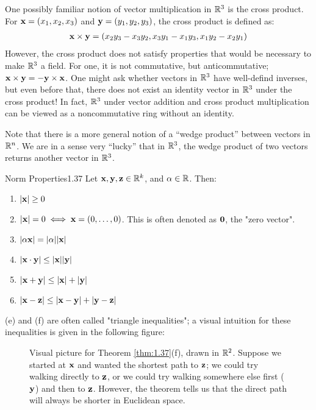 One possibly familiar notion of vector multiplication in $\mathbb{R}^3$ is the cross product. For $\mathbf{x} = (x_1, x_2, x_3)$ and $\mathbf{y} = (y_1, y_2, y_3)$, the cross product is defined as:
\begin{align*}
    \mathbf{x} \times \mathbf{y} = (x_2y_3 - x_3y_2, x_3y_1 - x_1y_3, x_1y_2 - x_2y_1)
\end{align*}
However, the cross product does not satisfy properties that would be necessary to make $\mathbb{R}^3$ a field. For one, it is not commutative, but anticommutative; $\mathbf{x} \times \mathbf{y} = -\mathbf{y} \times \mathbf{x}$. One might ask whether vectors in $\mathbb{R}^3$ have well-defind inverses, but even before that, there does not exist an identity vector in $\mathbb{R}^3$ under the cross product! In fact, $\mathbb{R}^3$ under vector addition and cross product multiplication can be viewed as a noncommutative ring without an identity. 

Note that there is a more general notion of a ``wedge product'' between vectors in $\mathbb{R}^n$. We are in a sense very ``lucky'' that in $\mathbb{R}^3$, the wedge product of two vectors returns another vector in $\mathbb{R}^3$. 

\begin{theorem}{Norm Properties}{1.37}
    Let $\mathbf{x}, \mathbf{y}, \mathbf{z} \in \mathbb{R}^k$, and $\alpha \in \mathbb{R}$. Then:
    \begin{enumerate}
        \item $\abs{\mathbf{x}} \geq 0$
        \item $\abs{\mathbf{x}} = 0 \iff \mathbf{x} = (0, \ldots, 0)$. This is often denoted as $\mathbf{0}$, the "zero vector". 
        \item $\abs{\alpha\mathbf{x}} = \abs{\alpha}\abs{\mathbf{x}}$
        \item $\abs{\mathbf{x} \cdot \mathbf{y}} \leq \abs{\mathbf{x}}\abs{\mathbf{y}}$ 
        \item $\abs{\mathbf{x} + \mathbf{y}} \leq \abs{\mathbf{x}} + \abs{\mathbf{y}}$
        \item $\abs{\mathbf{x} - \mathbf{z}} \leq \abs{\mathbf{x} - \mathbf{y}} + \abs{\mathbf{y} - \mathbf{z}}$
    \end{enumerate}
\end{theorem}
\noindent (e) and (f) are often called "triangle inequalities"; a visual intuition for these inequalities is given in the following figure:
\begin{figure}[htbp]
    \centering
    \caption{Visual picture for Theorem \ref{thm:1.37}(f), drawn in $\mathbb{R}^2$. Suppose we started at $\mathbf{x}$ and wanted the shortest path to $\mathbf{z}$; we could try walking directly to $\mathbf{z}$, or we could try walking somewhere else first ($\mathbf{y}$) and then to $\mathbf{z}$. However, the theorem tells us that the direct path will always be shorter in Euclidean space.}
    \label{<label>}
\end{figure}

